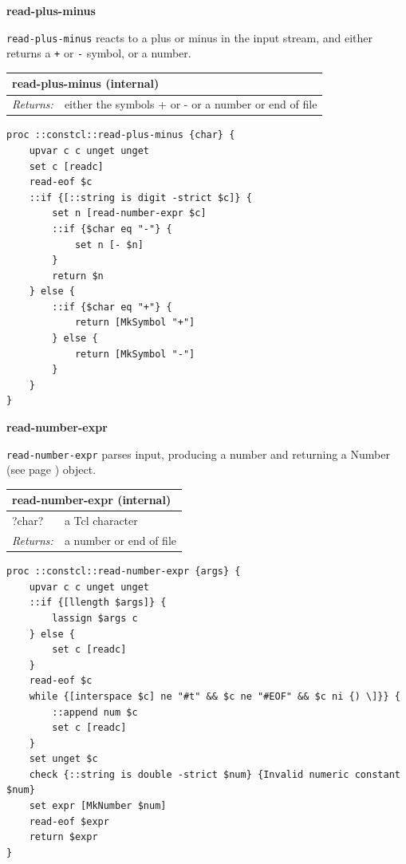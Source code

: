 \documentclass[twoside,9pt]{report}
\begin{document}
\textbf{read-plus-minus}


\texttt{read-plus-minus} reacts to a plus or minus in the input stream, and either returns a \texttt{+} or \texttt{-} symbol, or a number.

\begin{tabular}{ |l l| }
\hline
\multicolumn{2}{|l|}{read-plus-minus (internal)} \\
\hline
\textit{Returns:} & either the symbols + or - or a number or end of file \\
\hline
\end{tabular}

\noindent\makebox[\linewidth]{\rule{\linewidth}{0.4pt}}
\begin{lstlisting}
proc ::constcl::read-plus-minus {char} {
    upvar c c unget unget
    set c [readc]
    read-eof $c
    ::if {[::string is digit -strict $c]} {
        set n [read-number-expr $c]
        ::if {$char eq "-"} {
            set n [- $n]
        }
        return $n
    } else {
        ::if {$char eq "+"} {
            return [MkSymbol "+"]
        } else {
            return [MkSymbol "-"]
        }
    }
}
\end{lstlisting}
\noindent\makebox[\linewidth]{\rule{\linewidth}{0.4pt}}

\textbf{read-number-expr}


\texttt{read-number-expr} parses input, producing a number and returning a Number (see page \pageref{numbers}) object.

\begin{tabular}{ |l l| }
\hline
\multicolumn{2}{|l|}{read-number-expr (internal)} \\
\hline
?char? & a Tcl character \\
\textit{Returns:} & a number or end of file \\
\hline
\end{tabular}

\noindent\makebox[\linewidth]{\rule{\linewidth}{0.4pt}}
\begin{lstlisting}
proc ::constcl::read-number-expr {args} {
    upvar c c unget unget
    ::if {[llength $args]} {
        lassign $args c
    } else {
        set c [readc]
    }
    read-eof $c
    while {[interspace $c] ne "#t" && $c ne "#EOF" && $c ni {) \]}} {
        ::append num $c
        set c [readc]
    }
    set unget $c
    check {::string is double -strict $num} {Invalid numeric constant $num}
    set expr [MkNumber $num]
    read-eof $expr
    return $expr
}
\end{lstlisting}
\noindent\makebox[\linewidth]{\rule{\linewidth}{0.4pt}}
\end{document}
